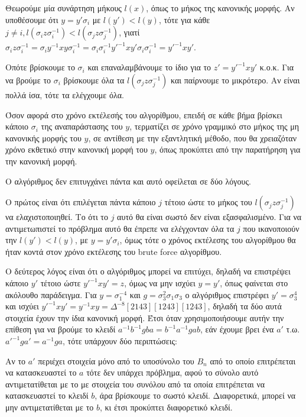 Θεωρούμε μία συνάρτηση μήκους $l(x)$, όπως το μήκος της κανονικής μορφής. Αν υποθέσουμε ότι $y=y'\sigma_i$ με $l(y')<l(y)$, τότε για κάθε $j\neq i, l(\sigma_i z \sigma_i^{-1})<l(\sigma_j z \sigma_j^{-1})$, γιατί $\sigma_i z \sigma_i^{-1}=  \sigma_i y^{-1}xy  \sigma_i^{-1}= \sigma_i  \sigma_i^{-1} y'^{-1}xy'\sigma_i\sigma_i^{-1}=y'^{-1}xy'$.

Οπότε βρίσκουμε το $\sigma_i$ και επαναλαμβάνουμε το ίδιο για το $z'=y'^{-1}xy'$ κ.ο.κ. Για να βρούμε το $\sigma_i$ βρίσκουμε όλα τα $l(\sigma_j z \sigma_j^{-1})$ και παίρνουμε το μικρότερο. Αν είναι πολλά ίσα, τότε τα ελέγχουμε όλα. 

Όσον αφορά στο χρόνο εκτέλεσής του αλγορίθμου, επειδή σε κάθε βήμα βρίσκει κάποιο $\sigma_i$ της αναπαράστασης του $y$, τερματίζει σε χρόνο γραμμικό στο μήκος της μη κανονικής μορφής του $y$, σε αντίθεση με την εξαντλητική μέθοδο, που θα χρειαζόταν χρόνο εκθετικό στην κανονική μορφή του $y$, όπως προκύπτει από την παρατήρηση για την κανονική μορφή. 

Ο αλγόριθμος δεν επιτυγχάνει πάντα και αυτό οφείλεται σε δύο λόγους. 

Ο πρώτος είναι ότι επιλέγεται πάντα κάποιο $ j $ τέτοιο ώστε το μήκος του $l(\sigma_j z \sigma_j^{-1})$ να ελαχιστοποιηθεί. Το ότι το $ j $ αυτό θα είναι σωστό δεν είναι εξασφαλισμένο. Για να αντιμετωπιστεί το πρόβλημα αυτό θα έπρεπε να ελέγχονταν όλα τα $ j $ που ικανοποιούν την $l(y')<l(y)$, με $y=y'\sigma_i$, όμως τότε ο χρόνος εκτέλεσης του αλγορίθμου θα ήταν κοντά στον χρόνο εκτέλεσης του brute force αλγορίθμου. 

Ο δεύτερος λόγος είναι ότι ο αλγόριθμος μπορεί να επιτύχει, δηλαδή να επιστρέψει κάποιο $ y' $ τέτοιο ώστε $ y'^{-1}xy'=z $, όμως να μην ισχύει $ y=y' $, όπως φαίνεται στο ακόλουθο παράδειγμα.
Για $ y= \sigma_1^{-4}$ και $ g=\sigma_3^2\sigma_1\sigma_3 $ ο αλγόριθμος επιστρέφει $ y'=\sigma_3^4 $ και ισχύει $ y'^{-1}xy'=y^{-1}xy=\Delta^{-8}[ 2     1     4     3][ 1     2     4     3][ 1     2     4     3] $, δηλαδή τα δύο αυτά στοιχεία έχουν την ίδια κανονική μορφή.
Έτσι όταν χρησιμοποιήσουμε αυτήν την επίθεση για να βρούμε το κλειδί $a^{-1}b^{-1}gba=b^{-1}a^{-1}gab$, εάν έχουμε βρει ένα $a'$ τ.ω. $a'^{-1}ga'=a^{-1}ga$, τότε υπάρχουν δύο περιπτώσεις: 

Αν το $a'$ περιέχει στοιχεία μόνο από το υποσύνολο του $ B_n $ από το οποίο επιτρέπεται να κατασκευαστεί το $ a $ τότε δεν υπάρχει πρόβλημα, αφού το σύνολο αυτό αντιμετατίθεται με το με στοιχεία του συνόλου από τα οποία επιτρέπεται να κατασκευαστεί το κλειδί $ b $, άρα βρίσκουμε το σωστό κλειδί. Διαφορετικά, μπορεί να μην αντιμετατίθεται με το $b$, κι έτσι προκύπτει διαφορετικό κλειδί.

